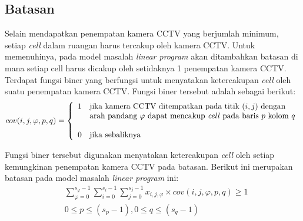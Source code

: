 \subsection{Batasan}
Selain mendapatkan penempatan kamera CCTV yang berjumlah minimum, setiap \textit{cell} dalam ruangan harus tercakup oleh kamera CCTV. Untuk memenuhinya, pada model masalah \textit{linear program} akan ditambahkan batasan di mana setiap cell harus dicakup oleh setidaknya 1 penempatan kamera CCTV. Terdapat fungsi biner yang berfungsi untuk menyatakan ketercakupan \textit{cell} oleh suatu penempatan kamera CCTV. Fungsi biner tersebut adalah sebagai berikut:
\begin{equation}
	cov(i,j,\varphi,p,q) =
	\left \{
		\begin{array}{ll}
			1 & \text{jika kamera CCTV ditempatkan pada titik } (i,j) \text{ dengan}\\
  			  & \text{arah pandang } \varphi \text{ dapat mencakup \textit{cell} pada baris } p\text{ kolom } q\\
  			  & \\
  			0 & \text{jika sebaliknya}
		\end{array}
	\right.
\end{equation}

Fungsi biner tersebut digunakan menyatakan ketercakupan \textit{cell} oleh setiap kemungkinan penempatan kamera CCTV pada batasan. Berikut ini merupakan batasan pada model masalah \textit{linear program} ini:
\begin{equation}
	\begin{split}
		& \sum_{\varphi=0}^{s_{\varphi}-1} \sum_{i=0}^{s_i-1} \sum_{j=0}^{s_j-1} x_{i,j,\varphi} \times cov(i,j,\varphi,p,q) \geq 1\\
		& 0 \leq p \leq (s_p - 1), 0 \leq q \leq (s_q - 1)
	\end{split}
\end{equation}

